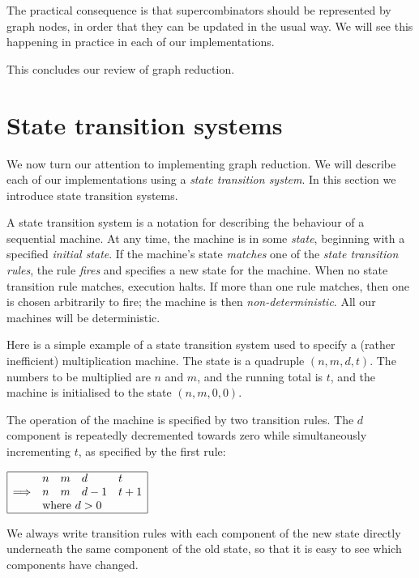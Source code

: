 The practical consequence is that supercombinators should be represented
by graph nodes, in order that they can be updated in the usual way.
We will see this happening in practice in each of our implementations.

This concludes our review of graph reduction.

\section{State transition systems}

We now turn our attention to implementing graph reduction.
We will describe each of our implementations using a
{\em state transition system}.
In this section we introduce state transition systems.

A state transition system
 is a notation for describing the
behaviour of a sequential machine.
At any time, the machine is in some {\em state}, beginning with a specified
{\em initial state}.
If the machine's state {\em matches\/} one of the
{\em state transition rules}, the rule {\em fires\/} and specifies a
new state for the machine.
When no state transition rule matches, execution halts.
If more than one rule matches, then one is chosen arbitrarily to fire; the
machine is then {\em non-deterministic}.  All our machines will be
deterministic.

Here is a simple example of a state transition system used to
specify a (rather inefficient) multiplication machine.  The state is a
quadruple $(n,m,d,t)$.  The numbers to be multiplied are $n$ and $m$, and
the running total is $t$, and
the machine is initialised to the state $(n,m,0,0)$.

The operation of the machine is specified by two transition rules.
The $d$ component is
repeatedly decremented towards zero while simultaneously incrementing $t$,
as specified by the first rule:
\begin{flushleft}
\qquad $\begin{array}{|lllll|}
\hline
                & n & m & d & t         \\
\Longrightarrow & n & m & d-1 & t+1     \\
                & \multicolumn{4}{l|}{\mbox{where}~d>0}  \\
\hline
\end{array}$
\end{flushleft}
We always write transition rules with each component of the new state
directly underneath the same component of the old state, so that it is
easy to see which components have changed.

